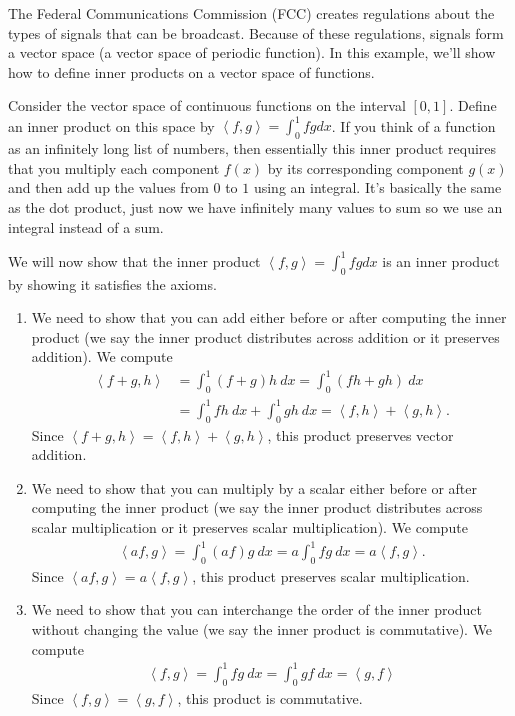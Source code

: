 \begin{example}
The Federal Communications Commission (FCC) creates regulations about the types of signals that can be broadcast.  
Because of these regulations, signals form a vector space (a vector space of periodic function). In this example, we'll show how to define inner products on a vector space of functions.

Consider the vector space of continuous functions on the interval $[0,1]$. Define an inner product on this space by $\left<f,g\right> = \int_0^1 fg dx$.  If you think of a function as an infinitely long list of numbers, then essentially this inner product requires that you multiply each component $f(x)$ by its corresponding component $g(x)$ and then add up the values from $0$ to $1$ using an integral. It's basically the same as the dot product, just now we have infinitely many values to sum so we use an integral instead of a sum.

We will now show that the inner product $\left<f,g\right> = \int_0^1 fg dx$ is an inner product by showing it satisfies the axioms.
\begin{enumerate}
	\item We need to show that you can add either before or after computing the inner product (we say the inner product distributes across addition or it preserves addition).  
	We compute \begin{align*}
	\left<f +g,h\right> 
	&=\int_0^1(f+g)h\ dx 
	= \int_0^1(fh+gh)\ dx \\
	&= \int_0^1fh\ dx + \int_0^1gh\ dx 
	=  \left<f,h\right> +\left<g,h\right>. 
	\end{align*} 
	Since $\left<f +g,h\right> = \left<f,h\right> +\left<g,h\right>$, this product preserves vector addition.

	\item We need to show that you can multiply by a scalar either before or after computing the inner product (we say the inner product distributes across scalar multiplication or it preserves scalar multiplication).  
	We compute \begin{align*}
	\left<af,g\right> 
	=\int_0^1(af)g\ dx 
	= a\int_0^1fg\ dx 
	=  a\left<f,g\right>.
	\end{align*}
	Since $\left<af,g\right> =a \left<f,g\right>$, this product preserves scalar multiplication.

	\item We need to show that you can interchange the order of the inner product without changing the value (we say the inner product is commutative). 
	We compute
		 \begin{align*}
		 \left<f,g\right> 
		 =  \int_0^1fg\ dx 
		 = \int_0^1gf\ dx 
		 = \left<g,f\right>
		 \end{align*} 
	Since $\left<f,g\right> =\left<g,f\right>$, this product is commutative. 
 	

\end{enumerate}
\end{example}
